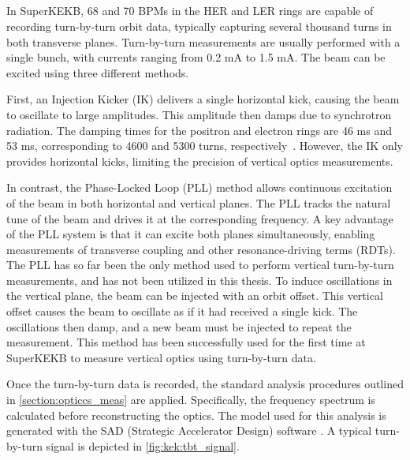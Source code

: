 \FloatBarrier
\subsection{}

In SuperKEKB, 68 and 70 BPMs in the HER and LER rings are capable of recording turn-by-turn orbit
data, typically capturing several thousand turns in both transverse planes. Turn-by-turn
measurements are usually performed with a single bunch, with currents ranging from 0.2 mA to 1.5 mA.
The beam can be excited using three different methods.

First, an Injection Kicker (IK) delivers a single horizontal kick, causing the beam to oscillate to
large amplitudes. This amplitude then damps due to synchrotron radiation. The damping times for the
positron and electron rings are 46 ms and 53 ms, corresponding to 4600 and 5300 turns,
respectively~\cite{keintzel_jacqueline_beam_2022}. However, the IK only provides horizontal kicks,
limiting the precision of vertical optics measurements.

In contrast, the Phase-Locked Loop (PLL) method allows continuous excitation of the beam in both
horizontal and vertical planes. The PLL tracks the natural tune of the beam and drives it at the
corresponding frequency. A key advantage of the PLL system is that it can excite both planes
simultaneously, enabling measurements of transverse coupling and other resonance-driving terms
(RDTs). The PLL has so far been the only method used to perform vertical turn-by-turn
measurements, and has not been utilized in this thesis.
To induce oscillations in the vertical plane, the beam can be injected with an orbit offset. This
vertical offset causes the beam to oscillate as if it had received a single kick. The oscillations
then damp, and a new beam must be injected to repeat the measurement. This method has been
successfully used for the first time at SuperKEKB to measure vertical optics using turn-by-turn
data.

Once the turn-by-turn data is recorded, the standard analysis procedures outlined in
\cref{section:opticcs_meas} are applied. Specifically, the frequency spectrum is calculated before
reconstructing the optics. The model used for this analysis is generated with the SAD (Strategic
Accelerator Design) software \cite{noauthor_sad_nodate}.
A typical turn-by-turn signal is depicted in \cref{fig:kek:tbt_signal}.


